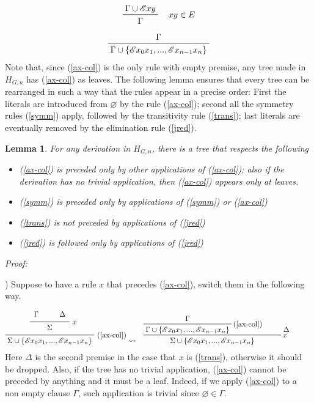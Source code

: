 \documentclass[a4paper,12pt,oneside]{book}
\newtheorem{lemma}[theorem]{Lemma}
\newcommand{\E}{\mathscr{E}}
\let\emptyset\varnothing
\begin{document}
\begin{equation}
\label{jred}
\prftree[r]{$\quad xy \in E $}{\Gamma \cup \E xy }{ \Gamma}
\end{equation}
\begin{equation}
 \label{ax-col}
\prftree{\Gamma}{ \Gamma \cup \{\E x_0 x_1 , ... , \E x_{n-1} x_n  \}}
\end{equation}
Note that, since (\ref{ax-col}) is the only rule with empty premise, any tree made in $H_{G,n}$  has (\ref{ax-col}) as leaves. The following lemma ensures that every tree can be rearranged in such a way that the rules appear in a precise order: First the literals are introduced from $\emptyset$ by the rule (\ref{ax-col}); second all the symmetry rules (\ref{symm}) apply, followed by the transitivity rule (\ref{trans}); last literals are eventually removed by the elimination rule (\ref{jred}).


\begin{lemma}\label{lemma_rules}
For any derivation in $H_{G,n}$, there is a tree that respects the following
\begin{itemize}
\item[1)] (\ref{ax-col}) is preceded only by other applications of (\ref{ax-col}); also if the derivation has no trivial application, then (\ref{ax-col}) appears only at leaves.
\item[2)] (\ref{symm}) is preceded only by applications of (\ref{symm}) or (\ref{ax-col})
\item[3)] (\ref{trans}) is not preceded by  applications of (\ref{jred})
\item[4)] (\ref{jred}) is followed only by  applications of (\ref{jred})
\end{itemize}\end{lemma}
\noindent\emph{Proof:}

) Suppose to have a rule $x$ that precedes (\ref{ax-col}), switch them in the following way. 

\begin{eqnarray*}
\prfrulenameskip=0.4em\prflinepadbefore=1ex
\prftree[r]{(\ref{ax-col})}{
\prftree[r]{$x$}{\Gamma}{\qquad\Delta}{\qquad\Sigma\qquad}
}{\Sigma\cup\{\E x_0 x_1 , ... , \E x_{n-1} x_n  \}}
& \leadsto
&\prftree[r]{$x$}{
\prftree[r]{(\ref{ax-col})}{\Gamma}{\Gamma\cup\{\E x_0 x_1 , ... , \E x_{n-1} x_n  \}}
}{\qquad\Delta\qquad\quad}{\Sigma\cup\{\E x_0 x_1 , ... , \E x_{n-1} x_n  \}}
 \end{eqnarray*}
Here $\Delta$ is the second premise in the case that $x$ is (\ref{trans}), otherwise it should be dropped. Also, if the tree has  no trivial application, (\ref{ax-col}) cannot be preceded by anything and it must be a leaf. Indeed, if we apply (\ref{ax-col}) to a non empty clause $\Gamma$, such application is trivial since $\emptyset\in\Gamma$.
 
\end{document}
